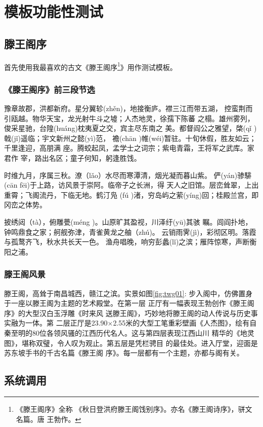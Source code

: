 \documentclass[a4paper,oneside,12pt]{book}
\begin{document}
\chapter{模板功能性测试}
\section{滕王阁序}
首先使用我最喜欢的古文《滕王阁序\footnote{《滕王阁序》全称
《秋日登洪府滕王阁饯别序》。亦名《滕王阁诗序》，骈文名篇。唐
王勃作。}》用作测试模板。

\subsection{《滕王阁序》前三段节选}
豫章故郡，洪都新府。星分翼轸(zhěn)，地接衡庐。襟三江而带五湖，
控蛮荆而引瓯越。物华天宝，龙光射牛斗之墟；人杰地灵，徐孺下陈蕃
之榻。雄州雾列，俊采星驰，台隍(huáng)枕夷夏之交，宾主尽东南之
美。都督阎公之雅望，棨(qǐ )戟(jǐ)遥临；宇文新州之懿(yì)范，
襜(chān )帷(wéi)暂驻。十旬休假，胜友如云；千里逢迎，高朋满
座。腾蛟起凤，孟学士之词宗；紫电青霜，王将军之武库。家君作
宰，路出名区；童子何知，躬逢胜饯。

时维九月，序属三秋。潦（lǎo）水尽而寒潭清，烟光凝而暮山紫。
俨(yán)骖騑(cān fēi)于上路，访风景于崇阿。临帝子之长洲，得
天人之旧馆。层峦耸翠，上出重霄；飞阁流丹，下临无地。鹤汀凫
(fú )渚，穷岛屿之萦(yíng)回；桂殿兰宫，即冈峦之体势。

披绣闼（tà），俯雕甍(méng )。山原旷其盈视，川泽纡(yū)其骇
瞩。闾阎扑地，钟鸣鼎食之家；舸舰弥津，青雀黄龙之舳（zhú)。
云销雨霁(jì)，彩彻区明。落霞与孤鹜齐飞，秋水共长天一色。
渔舟唱晚，响穷彭蠡(lǐ)之滨；雁阵惊寒，声断衡阳之浦。

\subsection{滕王阁风景}
滕王阁，高耸于南昌城西，赣江之滨。实景如图\ref{fig:twg01}:
步入阁中，仿佛置身于一座以滕王阁为主题的艺术殿堂。在第一层
正厅有一幅表现王勃创作《滕王阁序》的大型汉白玉浮雕《时来风
送滕王阁》，巧妙地将滕王阁的动人传说与历史事实融为一体。第
二层正厅是23.90×2.55米的大型工笔重彩壁画《人杰图》，绘有自
秦至明的80位各领风骚的江西历代名人。这与第四层表现江西山川
精华的《地灵图》，堪称双璧，令人叹为观止。第五层是凭栏骋目
的最佳处。进入厅堂，迎面是苏东坡手书的千古名篇《滕王阁
序》。每一层都有一个主题，亦都与阁有关。

\section{系统调用}
\end{document}

